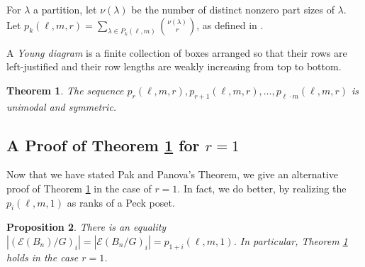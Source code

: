 \documentclass[smallextended, envcountsame, numbook]{svjour3}
\theoremstyle{plain}
\newtheorem{thm}{Theorem}[section]
\newtheorem{prop}[thm]{Proposition}
\theoremstyle{definition}
\theoremstyle{remark}
\numberwithin{equation}{section}
\newcommand\ssec{\subsection}
\begin{document}
For $\lambda$ a partition, let $\nu(\lambda)$ be the number of distinct nonzero part sizes of $\lambda$.  Let $p_k(\ell,m,r) = \sum_{\lambda \in P_k(\ell,m)} \binom{\nu(\lambda)}{r}$, as defined in \cite[Section 1]{pak}.

A {\it Young diagram} is a finite collection of boxes arranged
so that their rows are left-justified and their row lengths are weakly
increasing from top to bottom.

\begin{thm}
\label{thm:pak_thm}
\cite[Theorem 1.1]{pak}
The sequence $p_r(\ell,m,r), p_{r+1}(\ell,m,r),\ldots, p_{\ell\cdot m}(\ell,m,r)$ is unimodal and symmetric.
\end{thm}

\ssec{A Proof of Theorem \ref{thm:pak_thm} for $r = 1$}
Now that we have stated Pak and Panova's Theorem, we give an alternative proof of Theorem \ref{thm:pak_thm} in the case of $r=1$. In fact, we do better, by realizing the $p_i(\ell,m,1)$ as ranks of a Peck poset.

\begin{prop}
\label{prop:rank_gen_fn_wreath_1}
There is an equality $|(\mathcal E(B_n)/G)_i| = |\mathcal E(B_n/G)_i| = p_{1+i}(\ell,m,1)$. In particular, Theorem \ref{thm:pak_thm} holds in the case $r = 1$.
\end{prop}
\end{document}

